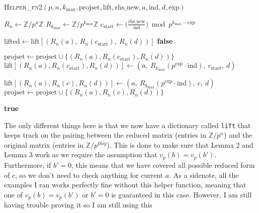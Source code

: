 \documentclass[letterpaper,12pt]{article}
\newcommand{\Z}{\mathbb{Z}}
\begin{document}
\begin{algorithm}
\caption{\textsc{Helper\_fn2}$(p, n, k_{\max}, \text{projset}, \text{lift}, \text{rhs\_new}, a, \text{ind}, d, \text{exp})$}
\begin{algorithmic}[1]
\State $R_n \gets \mathbb{Z}/p^n\mathbb{Z}$
\State $R_{k_{\max}} \gets \mathbb{Z}/p^{k_{\max}}\mathbb{Z}$
\State $c_{\text{start}} \gets \bigl( \frac{\text{rhs\_new}}{\text{ind}} \bigr) \bmod p^{k_{\max} - \text{exp}}$

    \State $\text{lifted} \gets \text{lift}[(R_n(a),\ R_n(c_{\text{start}}),\ R_n(d))]$
        \State \Return \textbf{false}
    \EndIf
\EndIf

\State $\text{projset} \gets \text{projset} \cup \{(R_n(a), R_n(c_{\text{start}}), R_n(d))\}$
\State $\text{lift}[(R_n(a), R_n(c_{\text{start}}), R_n(d))] \gets (a,\ R_{k_{\max}}(p^{\text{exp}} \cdot \text{ind}),\ c_{\text{start}},\ d)$

    \State $\text{lift}[(R_n(a), R_n(c), R_n(d))] \gets (a,\ R_{k_{\max}}(p^{\text{exp}} \cdot \text{ind}),\ c,\ d)$
    \State $\text{projset} \gets \text{projset} \cup \{(R_n(a), R_n(c), R_n(d))\}$
\EndFor

\State \Return \textbf{true}
\end{algorithmic}
\end{algorithm}

The only different things here is that we now have a dictionary called
\texttt{lift} that keeps track on the pairing between the reduced matrix
(entries in $\Z/p^n$) and the original matrix (entries in $\Z/p^{kbig}$).
This is done to make sure that Lemma 2 and Lemma 3 work as 
we require the assumption that $v_p(b) = v_p(b')$.
Furthermore, if $b' = 0$, this means that we have covered 
all possible reduced form of $c$, so we don't need to 
check anything for current $a$.
As a sidenote, all the examples I ran works perfectly fine 
without this helper function, meaning that one of
$v_p(b) = v_p(b')$ or $b' = 0$ is guaranteed in this case.
However, I am still having trouble proving it so I am still using this 

\end{document}

